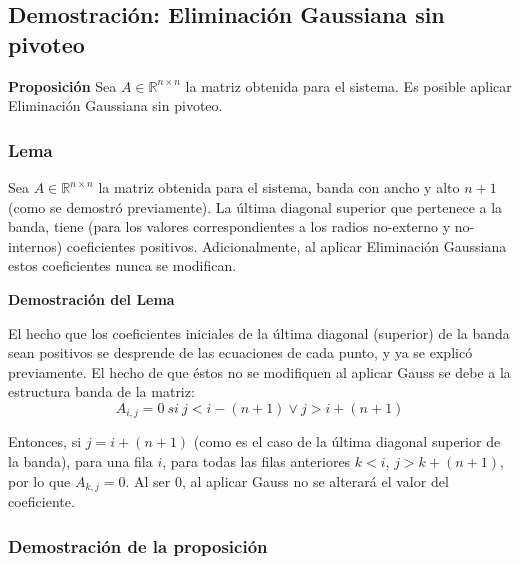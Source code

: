 

\subsection{Demostración: Eliminación Gaussiana sin pivoteo}

\textbf{Proposici\'on}
\hfill{}
Sea $A \in \mathbb{R}^{n \times n}$ la matriz obtenida para el sistema. Es posible aplicar Eliminaci\'on Gaussiana sin pivoteo.

\subsubsection{Lema}

\par Sea $A \in \mathbb{R}^{n \times n}$ la matriz obtenida para el sistema, banda con ancho y alto $n+1$ (como se demostr\'o previamente). 
La \'ultima diagonal superior que pertenece a la banda, tiene (para los valores correspondientes a los radios no-externo y no-internos) coeficientes positivos.
Adicionalmente, al aplicar Eliminaci\'on Gaussiana estos coeficientes nunca se modifican. \newline

\textbf{}
\textbf{}
\textbf{Demostraci\'on del Lema}

\par El hecho que los coeficientes iniciales de la \'ultima diagonal (superior) de la banda sean positivos se desprende de las ecuaciones de cada punto, y ya se explic\'o previamente.
El hecho de que \'estos no se modifiquen al aplicar Gauss se debe a la estructura banda de la matriz:
\begin{equation}
A_{i, j} = 0\ si\ j < i - (n+1) \vee j > i + (n +1)
\end{equation}
\par Entonces, si $j = i + (n+1)$ (como es el caso de la \'ultima diagonal superior de la banda), para una fila $i$, para todas las filas anteriores $k < i$, $j > k + (n+1)$, por lo que $A_{k, j} = 0$.
Al ser $0$, al aplicar Gauss no se alterar\'a el valor del coeficiente.

\subsubsection{Demostraci\'on de la proposici\'on}

